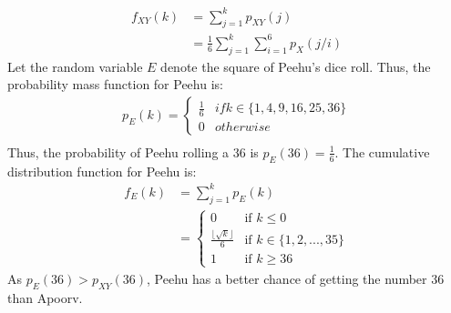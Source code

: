 \documentclass[journal,12pt,twocolumn]{IEEEtran}
\theoremstyle{remark}
\begin{document}
\begin{align}
    f_{XY}(k) &= \sum_{j = 1}^{k} p_{XY}(j)\\
    &= \frac{1}{6} \sum_{j = 1}^{k} \sum_{i = 1}^{6} p_X(j/i)
\end{align}
Let the random variable $E$ denote the square of Peehu's dice roll. Thus, the probability mass function for Peehu is:
\begin{align}
   p_E(k) = 
   \begin{cases}
        \frac{1}{6} & if k \in \{1, 4, 9, 16, 25, 36\}\\
        0 & otherwise
    \end{cases}\\
\end{align}
Thus, the probability of Peehu rolling a 36 is $p_E(36) = \frac{1}{6}$.
The cumulative distribution function for Peehu is:
\begin{align}
    f_E(k) &= \sum_{j = 1}^{k} p_E(k)\\
    &= 
    \begin{cases}
        0 & \text{if }k \leq 0\\
        \frac{\lfloor\sqrt{k}\rfloor}{6} & \text{if }k \in \{1, 2, ..., 35\}\\
        1 & \text{if }k \geq 36
    \end{cases}
\end{align}
As $p_{E}(36) > p_{XY}(36)$, Peehu has a better chance of getting the number 36 than Apoorv.
\end{document}
